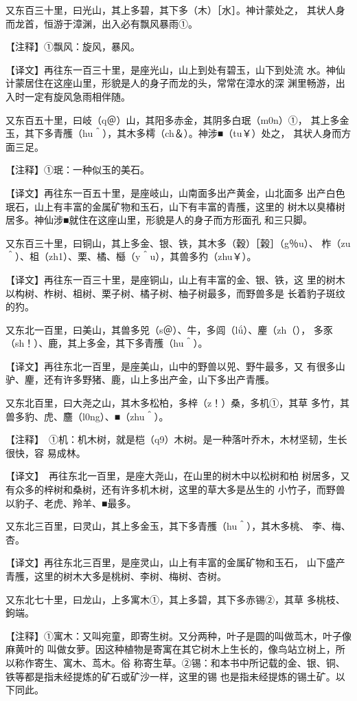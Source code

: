 \documentclass[a4paper,12pt,UTF8,twoside]{ctexbook}
\begin{document}
又东百三十里，曰光山，其上多碧，其下多（木）［水］。神计蒙处之， 其状人身而龙首，恒游于漳渊，出入必有飘风暴雨①。

【注释】①飘风：旋风，暴风。

【译文】再往东一百三十里，是座光山，山上到处有碧玉，山下到处流 水。神仙计蒙居住在这座山里，形貌是人的身子而龙的头，常常在漳水的深 渊里畅游，出入时一定有旋风急雨相伴随。

又东百五十里，曰岐（q＠）山，其阳多赤金，其阴多白珉（m0n）①， 其上多金玉，其下多青雘（hu＾），其木多樗（ch＆）。神涉■（tu￥）处之， 其状人身而方面三足。

【注释】①珉：一种似玉的美石。

【译文】再往东一百五十里，是座岐山，山南面多出产黄金，山北面多 出产白色珉石，山上有丰富的金属矿物和玉石，山下有丰富的青雘，这里的 树木以臭椿树居多。神仙涉■就住在这座山里，形貌是人的身子而方形面孔 和三只脚。

又东百三十里，曰铜山，其上多金、银、铁，其木多（穀）［榖］（g％u）、 柞（zu＾）、柤（zh1）、栗、橘、櫾（y＾u），其兽多犳（zhu￥）。

【译文】再往东一百三十里，是座铜山，山上有丰富的金、银、铁，这 里的树木以构树、柞树、柤树、栗子树、橘子树、柚子树最多，而野兽多是 长着豹子斑纹的犳。

又东北一百里，曰美山，其兽多兕（s＠）、牛，多闾（lǘ）、麈（zh（）， 多豕（sh！）、鹿，其上多金，其下多青雘（hu＾）。

【译文】再往东北一百里，是座美山，山中的野兽以兕、野牛最多，又 有很多山驴、麈，还有许多野猪、鹿，山上多出产金，山下多出产青雘。

又东北百里，曰大尧之山，其木多松柏，多梓（z！）桑，多机①，其草 多竹，其兽多豹、虎、麢（l0ng）、■（zhu＾）。

【注释】　①机：机木树，就是桤（q9）木树。是一种落叶乔木，木材坚韧，生长很快，容 易成林。

【译文】　再往东北一百里，是座大尧山，在山里的树木中以松树和柏 树居多，又有众多的梓树和桑树，还有许多机木树，这里的草大多是丛生的 小竹子，而野兽以豹子、老虎、羚羊、■最多。

又东北三百里，曰灵山，其上多金玉，其下多青雘（hu＾），其木多桃、 李、梅、杏。

【译文】再往东北三百里，是座灵山，山上有丰富的金属矿物和玉石， 山下盛产青雘，这里的树木大多是桃树、李树、梅树、杏树。

又东北七十里，曰龙山，上多寓木①，其上多碧，其下多赤锡②，其草 多桃枝、鉤端。

【注释】①寓木：又叫宛童，即寄生树。又分两种，叶子是圆的叫做茑木，叶子像麻黄叶的 叫做女萝。因这种植物是寄寓在其它树木上生长的，像鸟站立树上，所以称作寄生、寓木、茑木。俗 称寄生草。②锡：和本书中所记载的金、银、铜、铁等都是指未经提炼的矿石或矿沙一样，这里的锡 也是指未经提炼的锡土矿。以下同此。
\end{document}
